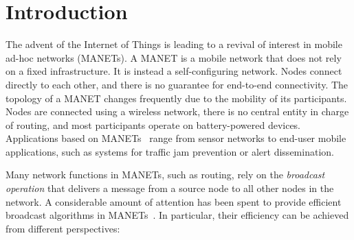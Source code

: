 
\section{Introduction}


The advent of the Internet of Things is leading to a revival of interest in mobile ad-hoc networks (MANETs).
%
A MANET is a mobile network that does not rely on a fixed infrastructure.
It is instead a self-configuring network.
%
Nodes connect directly to each other, and there is no guarantee for end-to-end connectivity.
%
The topology of a MANET changes frequently due to the mobility of its participants.
%
Nodes are connected using a wireless network, there is no central entity in charge of routing, and most participants operate on battery-powered devices.
%
Applications based on MANETs~\cite{overview_adhoc_networks} range from sensor networks to end-user mobile applications, such as systems for traffic jam prevention or alert dissemination.

Many network functions in MANETs, such as routing, rely on the \emph{broadcast operation} that delivers a message from a source node to all other nodes in the network.
%
A considerable amount of attention has been spent to provide efficient
broadcast algorithms in MANETs~\cite{Ovalle-Martinez2006, Qayyum2002, Wu2001, Cartigny:2003:BNR:2727141.2727459, Wu2004, Stojmenovic:2002:DSN:506156.506158}.
%
In particular, their efficiency can be achieved from different perspectives: 


